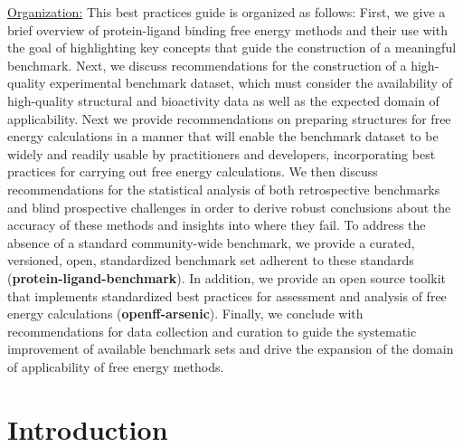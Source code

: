 \documentclass[9pt,bestpractices]{livecoms}
\begin{document}
\underline{Organization:} 
This best practices guide is organized as follows:
First, we give a brief overview of protein-ligand binding free energy methods and their use with the goal of highlighting key concepts that guide the construction of a meaningful benchmark.
Next, we discuss recommendations for the construction of a high-quality experimental benchmark dataset, which must consider the availability of high-quality structural and bioactivity data as well as the expected domain of applicability.
Next we provide recommendations on preparing structures for free energy calculations in a manner that will enable the benchmark dataset to be widely and readily usable by practitioners and developers, incorporating best practices for carrying out free energy calculations.
We then discuss recommendations for the statistical analysis of both retrospective benchmarks and blind prospective challenges in order to derive robust conclusions about the accuracy of these methods and insights into where they fail.
To address the absence of a standard community-wide benchmark, we provide a curated, versioned, open, standardized benchmark set adherent to these standards ({\bf protein-ligand-benchmark}). In addition, we provide an open source toolkit that implements standardized best practices for assessment and analysis of free energy calculations ({\bf openff-arsenic}).
Finally, we conclude with recommendations for data collection and curation to guide the systematic improvement of available benchmark sets and  drive the expansion of the domain of applicability of free energy methods.

\section{Introduction}
\label{sec:intro}
\end{document}
